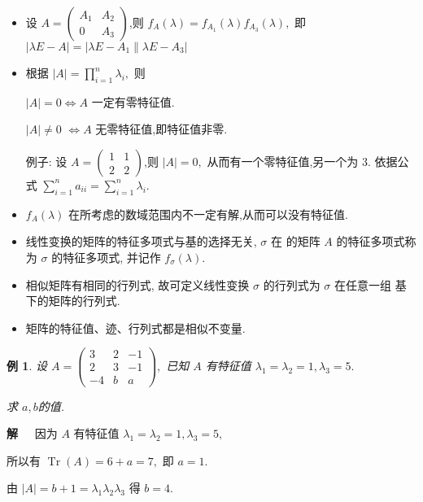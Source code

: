 \documentclass[13pt]{beamer}
\newtheorem{exa}{例}
\def\sol{{\bf 解~~ }}
\begin{document}
\begin{frame}
\begin{itemize}
	\item 设 $A=\left(\begin{array}{cc}A_{1} & A_{2} \\ 0 & A_{3}\end{array}\right)$,则 $f_{A}(\lambda)=f_{A_{1}}(\lambda) f_{A_{3}}(\lambda),$ 即 $|\lambda E-A|=\left|\lambda E-A_{1} \| \lambda E-A_{3}\right|$
	\item 根据 $|A|=\prod_{i=1}^{n} \lambda_{i},$ 则 
	
	$|A|=0 \Leftrightarrow A$ 一定有零特征值.
	
	 $|A| \neq 0$ 	$\Leftrightarrow A$ 无零特征值,即特征值非零.
	 
	 例子: 设 $A=\left(\begin{array}{ll}1 & 1 \\ 2 & 2\end{array}\right)$,则 $|A|=0,$ 从而有一个零特征值,另一个为 $3 .$ 依据公式 $\sum_{i=1}^{n} a_{i i}=\sum_{i=1}^{n} \lambda_{i}$.
	 
	 \item  $f_{A}(\lambda)$ 在所考虑的数域范围内不一定有解,从而可以没有特征值.
\end{itemize}
\end{frame}


\begin{frame}
\begin{itemize}
\item 线性变换的矩阵的特征多项式与基的选择无关, $\sigma$ 在 的矩阵
$A$ 的特征多项式称为 $\sigma$ 的特征多项式, 并记作 $f_{\sigma}(\lambda)$.
\item 相似矩阵有相同的行列式, 故可定义线性变换 $\sigma$ 的行列式为 $\sigma$ 在任意一组
基下的矩阵的行列式.
\item 矩阵的\alert{特征值}、\alert{迹}、\alert{行列式}都是相似不变量.
\end{itemize}
\end{frame}


\begin{frame}
\begin{exa}
设 $A=\left(\begin{array}{ccc}3 & 2 & -1 \\ 2 & 3 & -1 \\ -4 & b & a\end{array}\right),$ 已知 $A$ 有特征值 $\lambda_{1}=\lambda_{2}=1, \lambda_{3}=5.$ 

求 $a, b$的值.
\end{exa} 
\sol  因为 $A$ 有特征值 $\lambda_{1}=\lambda_{2}=1, \lambda_{3}=5, \quad$ 

所以有 $\operatorname{Tr}(A)=6+a=7,$ 即
$a=1 .$ 

由 $|A|=b+1=\lambda_{1} \lambda_{2} \lambda_{3}$ 得 $b=4$.

\end{frame}
\end{document}

